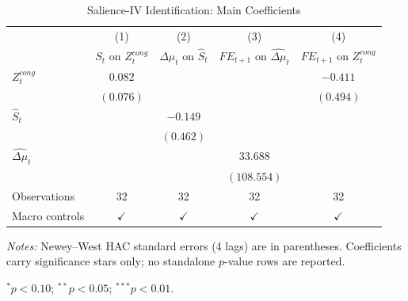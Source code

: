 \begin{table}[htbp]
\centering
\begin{threeparttable}
\caption{Salience-IV Identification: Main Coefficients}
\label{tab:identification_main}
{\small
\begin{tabular}{lcccc}
\toprule
 & \multicolumn{1}{c}{(1)} & \multicolumn{1}{c}{(2)} & \multicolumn{1}{c}{(3)} & \multicolumn{1}{c}{(4)} \\
 & $S_t$ on $Z_t^{cong}$ & $\Delta\mu_t$ on $\widehat{S}_t$ & $FE_{t+1}$ on $\widehat{\Delta\mu}_t$ & $FE_{t+1}$ on $Z_t^{cong}$ \\
\midrule
$Z_t^{cong}$ & $0.082$ &  &  & $-0.411$ \\
 & $(0.076)$ &  &  & $(0.494)$ \\
\addlinespace
$\widehat{S}_t$ &  & $-0.149$ &  &  \\
 &  & $(0.462)$ &  &  \\
\addlinespace
$\widehat{\Delta\mu}_t$ &  &  & $33.688$ &  \\
 &  &  & $(108.554)$ &  \\
\addlinespace
Observations & 32 & 32 & 32 & 32 \\
Macro controls & $\checkmark$ & $\checkmark$ & $\checkmark$ & $\checkmark$ \\
\bottomrule
\end{tabular}
}
\begin{tablenotes}[flushleft]
\footnotesize
\item \textit{Notes:} Newey--West HAC standard errors (4 lags) are in parentheses. Coefficients carry significance stars only; no standalone $p$-value rows are reported.
\item $^{*}p<0.10$; $^{**}p<0.05$; $^{***}p<0.01$.
\end{tablenotes}
\end{threeparttable}
\end{table}
